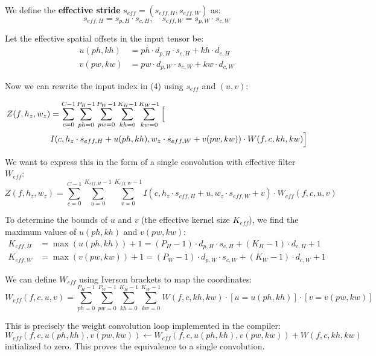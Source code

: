 \documentclass{article}
\begin{document}
We define the \textbf{effective stride} $s_{eff} = (s_{eff,H}, s_{eff,W})$ as:
\begin{equation}
    s_{eff,H} = s_{p,H} \cdot s_{c,H}, \quad s_{eff,W} = s_{p,W} \cdot s_{c,W}
\end{equation}

Let the effective spatial offsets in the input tensor be:
\begin{align}
    u(ph, kh) &= ph \cdot d_{p,H} \cdot s_{c,H} + kh \cdot d_{c,H} \\
    v(pw, kw) &= pw \cdot d_{p,W} \cdot s_{c,W} + kw \cdot d_{c,W}
\end{align}

Now we can rewrite the input index in (4) using $s_{eff}$ and $(u, v)$:

\[
\begin{aligned}
    Z(f, h_z, w_z) &=
    \sum_{c=0}^{C-1}
    \sum_{ph=0}^{P_H-1}
    \sum_{pw=0}^{P_W-1}
    \sum_{kh=0}^{K_H-1}
    \sum_{kw=0}^{K_W-1} \Big{[}
    \\ & I(c, h_z \cdot s_{eff,H} + u(ph, kh), w_z \cdot s_{eff,W} + v(pw, kw))
    \cdot W(f, c, kh, kw) \Big{]}
\end{aligned}
\]

We want to express this in the form of a single convolution with effective filter $W_{eff}$:
\begin{equation}
    Z(f, h_z, w_z) = \sum_{c=0}^{C-1} \sum_{u=0}^{K_{eff,H}-1} \sum_{v=0}^{K_{eff,W}-1} I(c, h_z \cdot s_{eff,H} + u, w_z \cdot s_{eff,W} + v) \cdot W_{eff}(f, c, u, v)
\end{equation}

To determine the bounds of $u$ and $v$ (the effective kernel size $K_{eff}$), we find the maximum values of $u(ph, kh)$ and $v(pw, kw)$:
\begin{align}
    K_{eff,H} &= \max(u(ph, kh)) + 1 = (P_H - 1) \cdot d_{p,H} \cdot s_{c,H} + (K_H - 1) \cdot d_{c,H} + 1 \\
    K_{eff,W} &= \max(v(pw, kw)) + 1 = (P_W - 1) \cdot d_{p,W} \cdot s_{c,W} + (K_W - 1) \cdot d_{c,W} + 1
\end{align}

We can define $W_{eff}$ using Iverson brackets to map the coordinates:
\begin{equation}
    W_{eff}(f, c, u, v) = \sum_{ph=0}^{P_H-1} \sum_{pw=0}^{P_W-1} \sum_{kh=0}^{K_H-1} \sum_{kw=0}^{K_W-1} W(f, c, kh, kw) \cdot [u = u(ph, kh)] \cdot [v = v(pw, kw)]
\end{equation}

This is precisely the weight convolution loop implemented in the compiler:
\begin{equation}
    W_{eff}(f, c, u(ph, kh), v(pw, kw)) \leftarrow W_{eff}(f, c, u(ph, kh), v(pw, kw)) + W(f, c, kh, kw)
\end{equation}
initialized to zero. This proves the equivalence to a single convolution.
\end{document}
